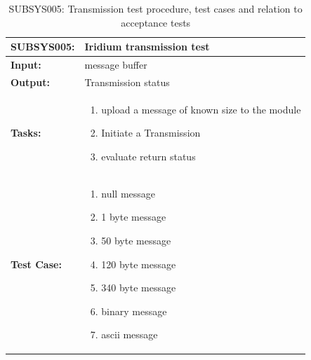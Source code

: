 \begin{table}[H]
    \centering
    \caption{SUBSYS005: Transmission test procedure, test cases and relation to acceptance tests}
    \begin{tabular}{|m{}|m{}|}
    \hline
       \textbf{SUBSYS005: }  &  Iridium transmission test\\
       \hline
        \textbf{Input: } &  message buffer\\
        \hline
        \textbf{Output: } & Transmission status\\
        \hline
        \textbf{Tasks: } & \begin{enumerate}
        \vspace{1mm}
            \item upload a message of known size to the module
            \item Initiate a Transmission
            \item evaluate return status
        \end{enumerate}\\
        \hline
        \textbf{Test Case: } & \begin{enumerate}
            \vspace{1mm}
            \item null message
            \item 1 byte message
            \item 50 byte message
            \item 120 byte message
            \item 340 byte message
            \item binary message
            \item ascii message
            
        \end{enumerate}\\
        \hline
    \end{tabular}

    \label{tab:SUBSYS005}
\end{table}

